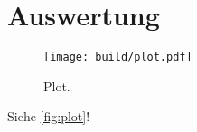 \section{Auswertung}
\label{sec:Auswertung}

\begin{figure}
  \centering
  \texttt{[image: build/plot.pdf]}
  \caption{Plot.}
  \label{fig:plot}
\end{figure}


Siehe \autoref{fig:plot}!
